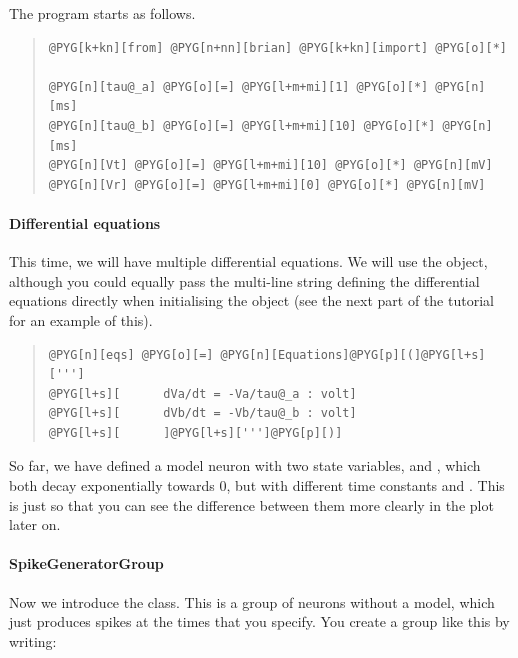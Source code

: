 \documentclass[letterpaper,10pt,english]{manual}
\begin{document}
The program starts as follows.
\begin{quote}

\begin{Verbatim}[commandchars=@\[\]]
@PYG[k+kn][from] @PYG[n+nn][brian] @PYG[k+kn][import] @PYG[o][*]

@PYG[n][tau@_a] @PYG[o][=] @PYG[l+m+mi][1] @PYG[o][*] @PYG[n][ms]
@PYG[n][tau@_b] @PYG[o][=] @PYG[l+m+mi][10] @PYG[o][*] @PYG[n][ms]
@PYG[n][Vt] @PYG[o][=] @PYG[l+m+mi][10] @PYG[o][*] @PYG[n][mV]
@PYG[n][Vr] @PYG[o][=] @PYG[l+m+mi][0] @PYG[o][*] @PYG[n][mV]
\end{Verbatim}
\end{quote}


\paragraph{Differential equations}

This time, we will have multiple differential equations. We will use the
\hyperlink{brian.Equations}{} object, although you could equally pass the multi-line string
defining the differential equations directly when initialising the \hyperlink{brian.NeuronGroup}{}
object (see the next part of the tutorial for an example of this).
\begin{quote}

\begin{Verbatim}[commandchars=@\[\]]
@PYG[n][eqs] @PYG[o][=] @PYG[n][Equations]@PYG[p][(]@PYG[l+s][''']
@PYG[l+s][      dVa/dt = -Va/tau@_a : volt]
@PYG[l+s][      dVb/dt = -Vb/tau@_b : volt]
@PYG[l+s][      ]@PYG[l+s][''']@PYG[p][)]
\end{Verbatim}
\end{quote}

So far, we have defined a model neuron with two state variables, 
and , which both decay exponentially towards 0, but with different
time constants  and . This is just so that you can see
the difference between them more clearly in the plot later on.


\paragraph{SpikeGeneratorGroup}

Now we introduce the \hyperlink{brian.SpikeGeneratorGroup}{} class. This is a group of
neurons without a model, which just produces spikes at the times
that you specify. You create a group like this by writing:
\end{document}
